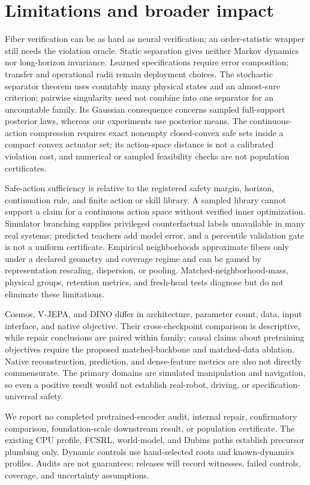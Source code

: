 \section{Limitations and broader impact}

Fiber verification can be as hard as neural verification; an order-statistic wrapper still needs
the violation oracle.  Static separation gives neither Markov dynamics nor long-horizon invariance.
Learned specifications require error composition; transfer and operational radii remain deployment
choices.  The stochastic separator theorem uses countably many physical states and an almost-sure
criterion; pairwise singularity need not combine into one separator for an uncountable family.
Its Gaussian consequence concerns sampled full-support posterior laws, whereas our experiments use
posterior means.  The continuous-action compression requires exact nonempty closed-convex safe sets
inside a compact convex actuator set; its action-space distance is not a calibrated violation cost,
and numerical or sampled feasibility checks are not population certificates.

Safe-action sufficiency is relative to the registered safety margin, horizon, continuation rule,
and finite action or skill library.  A sampled library cannot support a claim for a continuous
action space without verified inner optimization.  Simulator branching supplies privileged
counterfactual labels unavailable in many real systems; predicted teachers add model error, and a
percentile validation gate is not a uniform certificate.  Empirical neighborhoods approximate
fibers only under a declared geometry and coverage regime and can be gamed by representation
rescaling, dispersion, or pooling.  Matched-neighborhood-mass, physical groups, retention metrics,
and fresh-head tests diagnose but do not eliminate these limitations.

Cosmos, V-JEPA, and DINO differ in architecture, parameter count, data, input interface, and native
objective.  Their cross-checkpoint comparison is descriptive, while repair conclusions are paired
within family; causal claims about pretraining objectives require the proposed matched-backbone and
matched-data ablation.  Native reconstruction, prediction, and dense-feature metrics are also not
directly commensurate.  The primary domains are simulated manipulation and navigation, so even a
positive result would not establish real-robot, driving, or specification-universal safety.

We report no completed pretrained-encoder audit, internal repair, confirmatory comparison,
foundation-scale downstream result, or population certificate.  The existing CPU profile, FCSRL,
world-model, and Dubins paths establish precursor plumbing only.  Dynamic controls use hand-selected
roots and known-dynamics profiles.  Audits are not guarantees; releases will record witnesses,
failed controls, coverage, and uncertainty assumptions.
